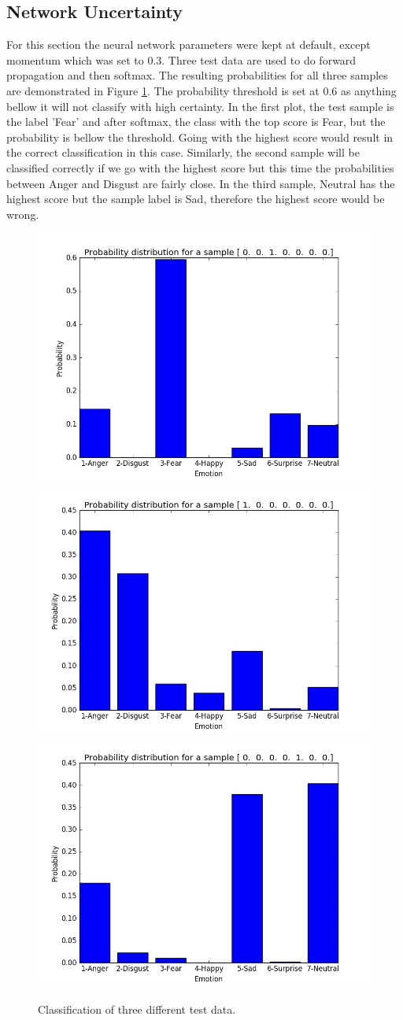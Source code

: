 \documentclass[12pt]{article}
\begin{document}
\subsection{Network Uncertainty}
For this section the neural network parameters were kept at default, except momentum which was set to 0.3. Three test data are used to do forward propagation and then softmax. The resulting probabilities for all three samples are demonstrated in Figure \ref{f35}. The probability threshold is set at 0.6 as anything bellow it will not classify with high certainty. In the first plot, the test sample is the label 'Fear' and after softmax, the class with the top score is Fear, but the probability is bellow the threshold. Going with the highest score would result in the correct classification in this case. Similarly, the second sample will be classified correctly if we go with the highest score but this time the probabilities between Anger and Disgust are fairly close. In the third sample, Neutral has the highest score but the sample label is Sad, therefore the highest score would be wrong. 

\begin{figure}[!htb]
\centering
\includegraphics[width=0.3\linewidth]{35/Sample1.jpg}
\includegraphics[width=0.3\linewidth]{35/Sample2.jpg}
\includegraphics[width=0.3\linewidth]{35/Sample3.jpg}
\vspace{-0.1in}
\caption{Classification of three different test data.}
\label{f35}
\vspace{-0.1in}
\end{figure}
\end{document}

